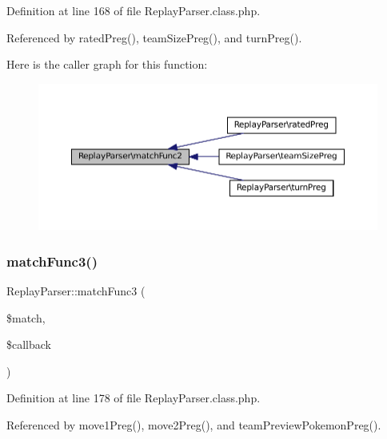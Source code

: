 Definition at line 168 of file Replay\+Parser.\+class.\+php.



Referenced by rated\+Preg(), team\+Size\+Preg(), and turn\+Preg().

Here is the caller graph for this function\+:\nopagebreak
\begin{figure}[H]
\begin{center}
\leavevmode
\includegraphics[width=350pt]{class_replay_parser_aeacf15eaec9b2286ec8d2f115da79dbc_icgraph}
\end{center}
\end{figure}
\mbox{\label{class_replay_parser_acd7c392f18f3b3ad335de013cce3933a}} 
\subsubsection{\texorpdfstring{match\+Func3()}{matchFunc3()}}
{\footnotesize\ttfamily Replay\+Parser\+::match\+Func3 (\begin{DoxyParamCaption}\item[{}]{\$match,  }\item[{}]{\$callback }\end{DoxyParamCaption})}



Definition at line 178 of file Replay\+Parser.\+class.\+php.



Referenced by move1\+Preg(), move2\+Preg(), and team\+Preview\+Pokemon\+Preg().

